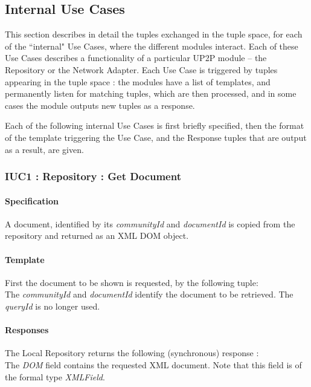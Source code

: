 \documentclass[titlepage]{article}%
\begin{document}
\subsection{Internal Use Cases}
\label{sec:moduleinteraction}

This section describes in detail the tuples exchanged in the tuple space, for each of the ``internal" Use Cases, where the different modules interact.
Each of these Use Cases describes a functionality of a particular UP2P module -- the Repository or the Network Adapter. 
Each Use Case is triggered by tuples appearing in the tuple space : the modules have a list of templates, and permanently listen for matching tuples, which are then processed, and in some cases the module outputs new tuples as a response.

Each of the following internal Use Cases is first briefly specified, then the format of the template triggering the Use Case, and the Response tuples that are output as a result, are given.

\subsubsection{IUC1 : Repository : Get Document}
\label{iuc1}
\paragraph{Specification}
A document, identified by its \emph{communityId} and \emph{documentId} is copied from the repository and returned as an XML DOM object.

\paragraph{Template}
First the document to be shown is requested, by the following tuple:
\begin{equation*}
[\text{``GetLocal"}; communityId; documentId; queryId]
\end{equation*}
The \emph{communityId} and \emph{documentId} identify the document to be retrieved. The \emph{queryId} is no longer used.

\paragraph{Responses}
The Local Repository returns the following (synchronous) response :
\begin{equation*}
[\text{``GetLocalR"}; communityId, documentId; DOM]
\end{equation*}
The \emph{DOM} field contains the requested XML document. Note that this field is of the formal type \emph{XMLField}.
\end{document}
